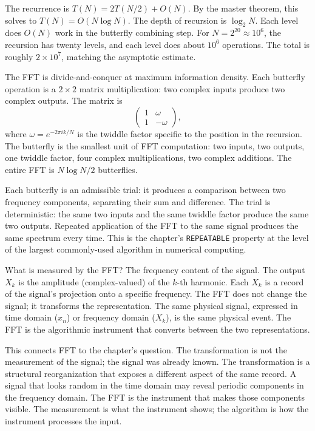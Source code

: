 The recurrence is $T(N) = 2 T(N/2) + O(N)$. By the master theorem, this
solves to $T(N) = O(N \log N)$. The depth of recursion is $\log_2 N$.
Each level does $O(N)$ work in the butterfly combining step. For
$N = 2^{20} \approx 10^6$, the recursion has twenty levels, and each
level does about $10^6$ operations. The total is roughly $2 \times 10^7$,
matching the asymptotic estimate.

The FFT is divide-and-conquer at maximum information density. Each
butterfly operation is a $2 \times 2$ matrix multiplication: two complex
inputs produce two complex outputs. The matrix is
\[
\begin{pmatrix}
1 & \omega \\
1 & -\omega
\end{pmatrix},
\]
where $\omega = e^{-2\pi i k / N}$ is the twiddle factor specific to the
position in the recursion. The butterfly is the smallest unit of FFT
computation: two inputs, two outputs, one twiddle factor, four complex
multiplications, two complex additions. The entire FFT is $N \log N / 2$
butterflies.

Each butterfly is an admissible trial: it produces a comparison between
two frequency components, separating their sum and difference. The trial
is deterministic: the same two inputs and the same twiddle factor produce
the same two outputs. Repeated application of the FFT to the same signal
produces the same spectrum every time. This is the chapter's
\texttt{REPEATABLE} property at the level of the largest commonly-used
algorithm in numerical computing.

What is measured by the FFT? The frequency content of the signal. The
output $X_k$ is the amplitude (complex-valued) of the $k$-th harmonic.
Each $X_k$ is a record of the signal's projection onto a specific
frequency. The FFT does not change the signal; it transforms the
representation. The same physical signal, expressed in time domain
($x_n$) or frequency domain ($X_k$), is the same physical event. The FFT
is the algorithmic instrument that converts between the two
representations.

This connects FFT to the chapter's question. The transformation is not
the measurement of the signal; the signal was already known. The
transformation is a structural reorganization that exposes a different
aspect of the same record. A signal that looks random in the time domain
may reveal periodic components in the frequency domain. The FFT is the
instrument that makes those components visible. The measurement is what
the instrument shows; the algorithm is how the instrument processes the
input.

